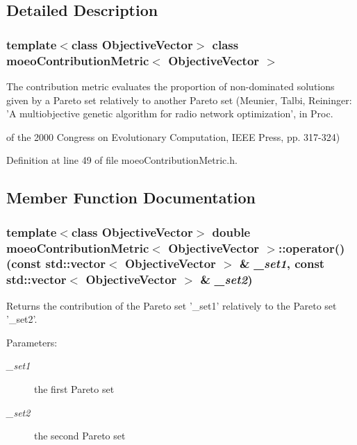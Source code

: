 \subsection{Detailed Description}
\subsubsection*{template$<$class Objective\-Vector$>$ class moeo\-Contribution\-Metric$<$ Objective\-Vector $>$}

The contribution metric evaluates the proportion of non-dominated solutions given by a Pareto set relatively to another Pareto set (Meunier, Talbi, Reininger: 'A multiobjective genetic algorithm for radio network optimization', in Proc. 

of the 2000 Congress on Evolutionary Computation, IEEE Press, pp. 317-324) 



Definition at line 49 of file moeo\-Contribution\-Metric.h.

\subsection{Member Function Documentation}
\subsubsection{\setlength{\rightskip}{0pt plus 5cm}template$<$class Objective\-Vector$>$ double \bf{moeo\-Contribution\-Metric}$<$ \bf{Objective\-Vector} $>$::operator() (const std::vector$<$ \bf{Objective\-Vector} $>$ \& {\em \_\-set1}, const std::vector$<$ \bf{Objective\-Vector} $>$ \& {\em \_\-set2})\hspace{0.3cm}{\tt  [inline]}}\label{classmoeoContributionMetric_491610f6557874c2989eaa7a75117dcb}


Returns the contribution of the Pareto set '\_\-set1' relatively to the Pareto set '\_\-set2'. 

\begin{Desc}
\item[Parameters:]
\begin{description}
\item[{\em \_\-set1}]the first Pareto set \item[{\em \_\-set2}]the second Pareto set \end{description}
\end{Desc}


